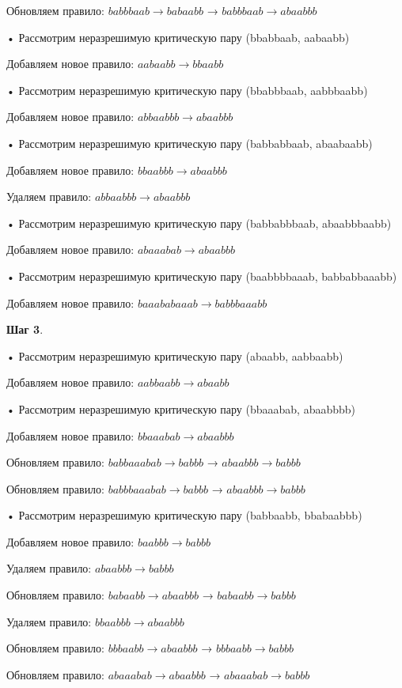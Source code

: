 \documentclass[a4paper, 14pt]{extarticle}
\begin{document}
    Обновляем правило: $babbbaab \to babaabb$ → $babbbaab \to abaabbb$

   • Рассмотрим неразрешимую критическую пару (bbabbaab, aabaabb)

        Добавляем новое правило: $aabaabb \to bbaabb$

   • Рассмотрим неразрешимую критическую пару (bbabbbaab, aabbbaabb)

        Добавляем новое правило: $abbaabbb \to abaabbb$

   • Рассмотрим неразрешимую критическую пару (babbabbaab, abaabaabb)

        Добавляем новое правило: $bbaabbb \to abaabbb$

    Удаляем правило: $abbaabbb \to abaabbb$

   • Рассмотрим неразрешимую критическую пару (babbabbbaab, abaabbbaabb)

        Добавляем новое правило: $abaaabab \to abaabbb$

   • Рассмотрим неразрешимую критическую пару (baabbbbaaab, babbabbaaabb)

        Добавляем новое правило: $baaababaaab \to babbbaaabb$


 \textbf{Шаг 3}.

   • Рассмотрим неразрешимую критическую пару (abaabb, aabbaabb)

        Добавляем новое правило: $aabbaabb \to abaabb$

   • Рассмотрим неразрешимую критическую пару (bbaaabab, abaabbbb)

        Добавляем новое правило: $bbaaabab \to abaabbb$

    Обновляем правило: $babbaaabab \to babbb$ → $abaabbb \to babbb$

    Обновляем правило: $babbbaaabab \to babbb$ → $abaabbb \to babbb$

   • Рассмотрим неразрешимую критическую пару (babbaabb, bbabaabbb)

        Добавляем новое правило: $baabbb \to babbb$

    Удаляем правило: $abaabbb \to babbb$

    Обновляем правило: $babaabb \to abaabbb$ → $babaabb \to babbb$

    Удаляем правило: $bbaabbb \to abaabbb$

    Обновляем правило: $bbbaabb \to abaabbb$ → $bbbaabb \to babbb$

    Обновляем правило: $abaaabab \to abaabbb$ → $abaaabab \to babbb$
\end{document}
